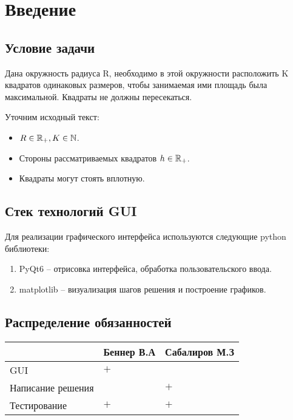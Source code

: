 \chapter{Введение}


\section{Условие задачи}
\begin{ex}
Дана окружность радиуса R, необходимо в этой окружности расположить K
квадратов одинаковых размеров, чтобы занимаемая ими площадь была
максимальной. Квадраты не должны пересекаться.    
\end{ex}

Уточним исходный текст:
\begin{itemize}
    \item $R \in \mathbb{R}_+, K \in \mathbb{N}$.
    \item Стороны рассматриваемых квадратов $h \in \mathbb{R}_+$.
    \item Квадраты могут стоять вплотную.
\end{itemize}
\section{Стек технологий GUI}
Для реализации графического интерфейса используются следующие python библиотеки:
\begin{enumerate}
    \item PyQt6 -- отрисовка интерфейса, обработка пользовательского ввода.
    \item matplotlib -- визуализация шагов решения и построение графиков.
\end{enumerate}
\section{Распределение обязанностей}
\begin{table}[!h]
    \centering
    \begin{tabular}{|l|l|l|}
        \hline
                                & \textbf{Беннер В.А} & \textbf{Сабалиров М.З} \\ \hline
        GUI              & $+$                   &                        \\ \hline
        Написание решения &                     & $+$                      \\ \hline
        Тестирование      & $+$                   & $+$                      \\ \hline
    \end{tabular}
\end{table}    
